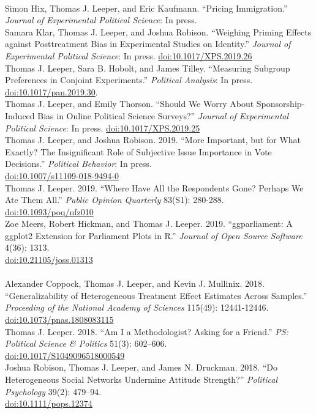 \documentclass[12pt]{article}
\renewcommand{\section}[1]{\pagebreak[3]%
    \llap{\scshape\smash{\parbox[t]{\marginparwidth}{\raggedright {\color{lg}#1}}}}%
    \vspace{-\baselineskip}\par}
\newcommand{\topic}[1]{\pagebreak[3]\indent {\color{lg}{\footnotesize #1 }}\\}
\newcommand{\entry}[1]{\indent {\color{lg}\guillemotright}\hspace{2pt}#1\vspace{.25em}\\}
\begin{document}
\section{Publications}
\topic{Peer-Reviewed Publications: 2019}
	\entry{Simon Hix, Thomas J. Leeper, and Eric Kaufmann. ``Pricing Immigration.'' \textit{Journal of Experimental Political Science}: In press.}
	\entry{Samara Klar, Thomas J. Leeper, and Joshua Robison. ``Weighing Priming Effects against Posttreatment Bias in Experimental Studies on Identity.'' \textit{Journal of Experimental Political Science}: In press. \href{https://doi.org/10.1017/XPS.2019.26}{doi:10.1017/XPS.2019.26}}
    \entry{Thomas J. Leeper, Sara B. Hobolt, and James Tilley. ``Measuring Subgroup Preferences in Conjoint Experiments.'' \textit{Political Analysis}: In press. \href{https://doi.org/10.1017/pan.2019.30}{doi:10.1017/pan.2019.30}.}
    \entry{Thomas J. Leeper, and Emily Thorson. ``Should We Worry About Sponsorship-Induced Bias in Online Political Science Surveys?'' \textit{Journal of Experimental Political Science}: In press. \href{https://doi.org/10.1017/XPS.2019.25}{doi:10.1017/XPS.2019.25}}
    \entry{Thomas J. Leeper, and Joshua Robison. 2019. ``More Important, but for What Exactly? The Insignificant Role of Subjective Issue Importance in Vote Decisions.'' \textit{Political Behavior}: In press.\\ \href{https://doi.org/10.1007/s11109-018-9494-0}{doi:10.1007/s11109-018-9494-0}}
    \entry{Thomas J. Leeper. 2019. ``Where Have All the Respondents Gone? Perhaps We Ate Them All.'' \textit{Public Opinion Quarterly} 83(S1): 280-288. \href{https://doi.org/10.1093/poq/nfz010}{doi:10.1093/poq/nfz010}}
	\entry{Zoe Meers, Robert Hickman, and Thomas J. Leeper. 2019. ``ggparliament: A ggplot2 Extension for Parliament Plots in R.'' \textit{Journal of Open Source Software} 4(36): 1313.\\ \href{https://doi.org/10.21105/joss.01313}{doi:10.21105/joss.01313}}

\topic{Peer-Reviewed Publications: 2018}
    \entry{Alexander Coppock, Thomas J. Leeper, and Kevin J. Mullinix. 2018. ``Generalizability of Heterogeneous Treatment Effect Estimates Across Samples.'' \textit{Proceeding of the National Academy of Sciences} 115(49): 12441-12446.\\ \href{https://doi.org/10.1073/pnas.1808083115}{doi:10.1073/pnas.1808083115}}
	\entry{Thomas J. Leeper. 2018. ``Am I a Methodologist? Asking for a Friend.'' \textit{PS: Political Science \& Politics} 51(3): 602--606.\\ \href{https://doi.org/10.1017/S1049096518000549}{doi:10.1017/S1049096518000549}}
	\entry{Joshua Robison, Thomas J. Leeper, and James N. Druckman. 2018. ``Do Heterogeneous Social Networks Undermine Attitude Strength?'' \textit{Political Psychology} 39(2): 479--94.\\ \href{http://doi.org/10.1111/pops.12374}{doi:10.1111/pops.12374}}
\end{document}

